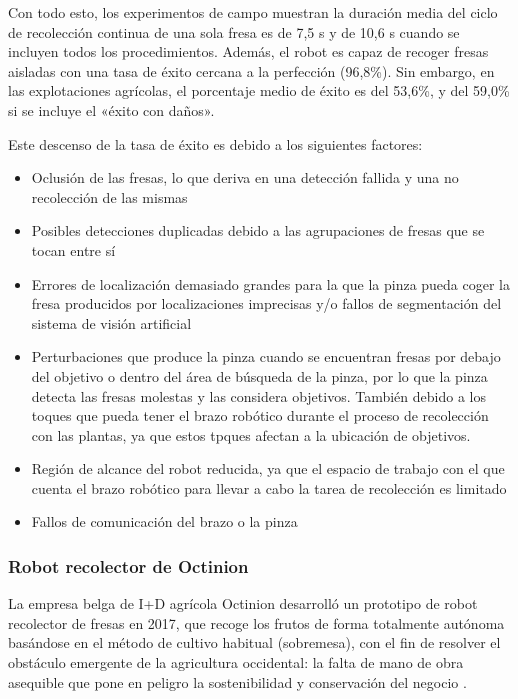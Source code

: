 Con todo esto, los experimentos de campo muestran la duración media del ciclo de recolección continua de una sola fresa es de 7,5 s y de 10,6 s cuando se incluyen todos los procedimientos. Además, el robot es capaz de recoger fresas aisladas con una tasa de éxito cercana a la perfección (96,8\%). Sin embargo, en las explotaciones agrícolas, el porcentaje medio de éxito es del 53,6\%, y del 59,0\% si se incluye el «éxito con daños».

Este descenso de la tasa de éxito es debido a los siguientes factores:

\begin{itemize}
    \item Oclusión de las fresas, lo que deriva en una detección fallida y una no recolección de las mismas
    \item Posibles detecciones duplicadas debido a las agrupaciones de fresas que se tocan entre sí
    \item Errores de localización demasiado grandes para la que la pinza pueda coger la fresa producidos por localizaciones imprecisas y/o fallos de segmentación del sistema de visión artificial
    \item Perturbaciones que produce la pinza cuando se encuentran fresas por debajo del objetivo o dentro del área de búsqueda de la pinza, por lo que la pinza detecta las fresas molestas y las considera objetivos. También debido a los toques que pueda tener el brazo robótico durante el proceso de recolección con las plantas, ya que estos tpques afectan a la ubicación de objetivos.
    \item Región de alcance del robot reducida, ya que el espacio de trabajo con el que cuenta el brazo robótico para llevar a cabo la tarea de recolección es limitado
    \item Fallos de comunicación del brazo o la pinza
\end{itemize}



\subsubsection{Robot recolector de Octinion}
La empresa belga de I+D agrícola Octinion desarrolló un prototipo de robot recolector de fresas en 2017, que recoge los frutos de forma totalmente autónoma basándose en el método de cultivo habitual (sobremesa), con el fin de resolver el obstáculo emergente de la agricultura occidental: la falta de mano de obra asequible que pone en peligro la sostenibilidad y conservación del negocio \cite{DePreter18}.\\

